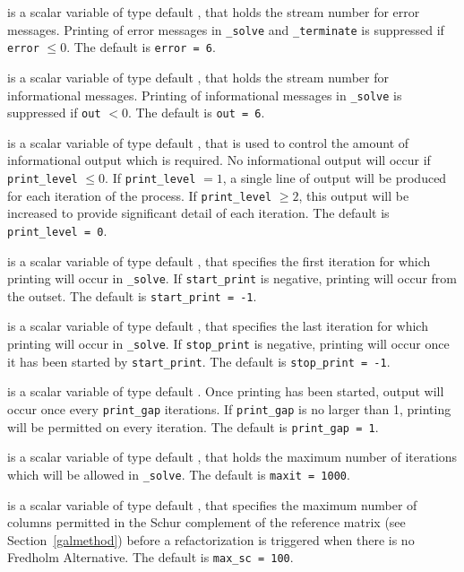 \begin{description}

 is a scalar variable of type default \integer, that holds the
stream number for error messages. Printing of error messages in
{\tt \packagename\_solve} and {\tt \packagename\_terminate} is suppressed if
{\tt error} $\leq 0$.
The default is {\tt error = 6}.

 is a scalar variable of type default \integer, that holds the
stream number for informational messages. Printing of informational messages in
{\tt \packagename\_solve} is suppressed if {\tt out} $< 0$.
The default is {\tt out = 6}.

 is a scalar variable of type default \integer, that is used
to control the amount of informational output which is required. No
informational output will occur if {\tt print\_level} $\leq 0$. If
{\tt print\_level} $= 1$, a single line of output will be produced for each
iteration of the process. If {\tt print\_level} $\geq 2$, this output will be
increased to provide significant detail of each iteration.
The default is {\tt print\_level = 0}.

 is a scalar variable of type default \integer, that specifies
the first iteration for which printing will occur in {\tt \packagename\_solve}.
If {\tt start\_print} is negative, printing will occur from the outset.
The default is {\tt start\_print = -1}.

 is a scalar variable of type default \integer, that specifies
the last iteration for which printing will occur in  {\tt \packagename\_solve}.
If {\tt stop\_print} is negative, printing will occur once it has been
started by {\tt start\_print}.
The default is {\tt stop\_print = -1}.

 is a scalar variable of type default \integer.
Once printing has been started, output will occur once every
{\tt print\_gap} iterations. If {\tt print\_gap} is no larger than 1,
printing will be permitted on every iteration.
The default is {\tt print\_gap = 1}.

 is a scalar variable of type default \integer, that holds the
maximum number of iterations which will be allowed in {\tt \packagename\_solve}.
The default is {\tt maxit = 1000}.

 is a scalar variable of type default \integer, that specifies
the maximum number of columns permitted in the Schur complement of the
reference matrix (see Section~\ref{galmethod})
before a refactorization is triggered when there is no Fredholm Alternative.
The default is {\tt max\_sc = 100}.


\end{description}
